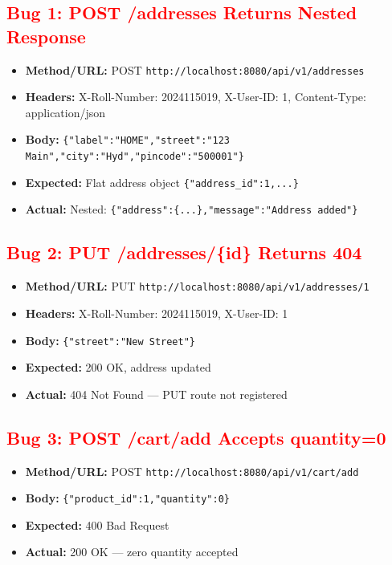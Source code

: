 \documentclass{article}
\begin{document}
\subsection*{\textcolor{red}{Bug 1: POST /addresses Returns Nested Response}}
\begin{itemize}[noitemsep]
  \item \textbf{Method/URL:} POST \texttt{http://localhost:8080/api/v1/addresses}
  \item \textbf{Headers:} X-Roll-Number: 2024115019, X-User-ID: 1, Content-Type: application/json
  \item \textbf{Body:} \texttt{\{"label":"HOME","street":"123 Main","city":"Hyd","pincode":"500001"\}}
  \item \textbf{Expected:} Flat address object \texttt{\{"address\_id":1,...\}}
  \item \textbf{Actual:} Nested: \texttt{\{"address":\{...\},"message":"Address added"\}}
\end{itemize}

\subsection*{\textcolor{red}{Bug 2: PUT /addresses/\{id\} Returns 404}}
\begin{itemize}[noitemsep]
  \item \textbf{Method/URL:} PUT \texttt{http://localhost:8080/api/v1/addresses/1}
  \item \textbf{Headers:} X-Roll-Number: 2024115019, X-User-ID: 1
  \item \textbf{Body:} \texttt{\{"street":"New Street"\}}
  \item \textbf{Expected:} 200 OK, address updated
  \item \textbf{Actual:} 404 Not Found — PUT route not registered
\end{itemize}

\subsection*{\textcolor{red}{Bug 3: POST /cart/add Accepts quantity=0}}
\begin{itemize}[noitemsep]
  \item \textbf{Method/URL:} POST \texttt{http://localhost:8080/api/v1/cart/add}
  \item \textbf{Body:} \texttt{\{"product\_id":1,"quantity":0\}}
  \item \textbf{Expected:} 400 Bad Request
  \item \textbf{Actual:} 200 OK — zero quantity accepted
\end{itemize}
\end{document}
